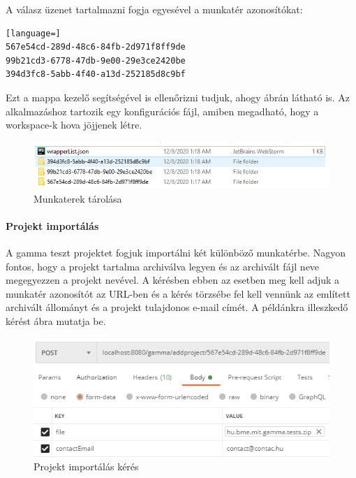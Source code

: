 \noindent A válasz üzenet tartalmazni fogja egyesével a  munkatér azonosítókat:
\begin{lstlisting}[language=]
567e54cd-289d-48c6-84fb-2d971f8ff9de
99b21cd3-6778-47db-9e00-29e3ce2420be
394d3fc8-5abb-4f40-a13d-252185d8c9bf
\end{lstlisting}

Ezt a mappa kezelő segítségével is ellenőrizni tudjuk, ahogy  ábrán látható is. Az alkalmazáshoz tartozik egy  konfigurációs fájl, amiben megadható, hogy a workspace-k hova jöjjenek létre.

\begin{figure}[!ht]
	\includegraphics[width=\textwidth, keepaspectratio]{figures/workspace_infile.PNG}
	\caption{Munkaterek tárolása}
	\label{fig:workspace_infile}
\end{figure}

\paragraph{Projekt importálás} A gamma teszt projektet fogjuk importálni két különböző munkatérbe. Nagyon fontos, hogy a projekt tartalma archiválva legyen és az archivált fájl neve megegyezzen a projekt nevével. A kérésben ebben az esetben meg kell adjuk a munkatér azonosítót az URL-ben és a kérés törzsébe fel kell vennünk az említett archivált állományt és a projekt tulajdonos e-mail címét. A példánkra illeszkedő kérést  ábra mutatja be.


\begin{figure}[!ht]
	\includegraphics[keepaspectratio]{figures/add_project_request.PNG}
	\caption{Projekt importálás kérés}
	\label{fig:add_project_request}
\end{figure}

